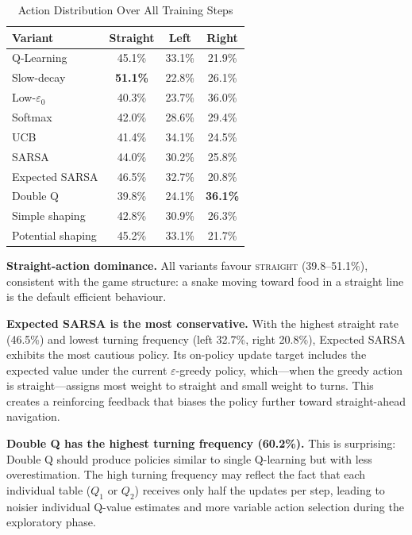 \documentclass[10pt,conference]{IEEEtran}
\begin{document}
\begin{table}[h]
  \centering
  \caption{Action Distribution Over All Training Steps}
  \label{tab:actions}
  \begin{tabular}{lccc}
    \toprule
    Variant & Straight & Left & Right \\
    \midrule
    Q-Learning        & 45.1\% & 33.1\% & 21.9\% \\
    Slow-decay        & \textbf{51.1\%} & 22.8\% & 26.1\% \\
    Low-$\varepsilon_0$ & 40.3\% & 23.7\% & 36.0\% \\
    Softmax           & 42.0\% & 28.6\% & 29.4\% \\
    UCB               & 41.4\% & 34.1\% & 24.5\% \\
    SARSA             & 44.0\% & 30.2\% & 25.8\% \\
    Expected SARSA    & 46.5\% & 32.7\% & 20.8\% \\
    Double Q          & 39.8\% & 24.1\% & \textbf{36.1\%} \\
    Simple shaping    & 42.8\% & 30.9\% & 26.3\% \\
    Potential shaping & 45.2\% & 33.1\% & 21.7\% \\
    \bottomrule
  \end{tabular}
\end{table}

\textbf{Straight-action dominance.}
All variants favour \textsc{straight} (39.8--51.1\%),
consistent with the game structure: a snake moving toward food
in a straight line is the default efficient behaviour.

\textbf{Expected SARSA is the most conservative.}
With the highest straight rate (46.5\%) and lowest turning
frequency (left 32.7\%, right 20.8\%), Expected SARSA exhibits
the most cautious policy.
Its on-policy update target includes the expected value under
the current $\varepsilon$-greedy policy, which---when the
greedy action is straight---assigns most weight to straight
and small weight to turns.
This creates a reinforcing feedback that biases the policy further
toward straight-ahead navigation.

\textbf{Double Q has the highest turning frequency (60.2\%).}
This is surprising: Double Q should produce policies similar to
single Q-learning but with less overestimation.
The high turning frequency may reflect the fact that each individual
table ($Q_1$ or $Q_2$) receives only half the updates per step,
leading to noisier individual Q-value estimates and more variable
action selection during the exploratory phase.
\end{document}
